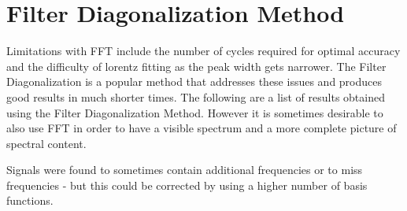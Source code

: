 
%




\section{Filter Diagonalization Method}

Limitations with FFT include the number of cycles required for optimal accuracy and the difficulty of lorentz fitting as the peak width gets narrower. The Filter Diagonalization is a popular method that addresses these issues and produces good results in much shorter times. The following are a list of results obtained using the Filter Diagonalization Method. However it is sometimes desirable to also use FFT in order to have a visible spectrum and a more complete picture of spectral content.

Signals were found to sometimes contain additional frequencies or to miss frequencies - but this could be corrected by using a higher number of basis functions.


